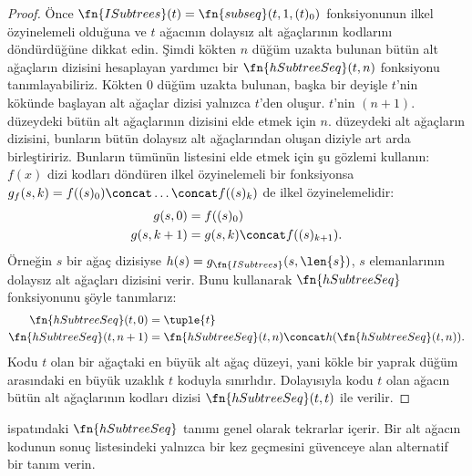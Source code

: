 \begin{proof}
  Önce $\fn{ISubtrees}(t)=\fn{subseq}(t,1,(t)_0)$ fonksiyonunun ilkel
  özyinelemeli olduğuna ve $t$ ağacının dolaysız alt ağaçlarının kodlarını
  döndürdüğüne dikkat edin. Şimdi kökten $n$ düğüm uzakta bulunan bütün alt
  ağaçların dizisini hesaplayan yardımcı bir $\fn{hSubtreeSeq}(t,n)$
  fonksiyonu tanımlayabiliriz. Kökten $0$ düğüm uzakta bulunan, başka bir
  deyişle $t$'nin kökünde başlayan alt ağaçlar dizisi yalnızca $t$'den
  oluşur. $t$'nin $(n+1)$. düzeydeki bütün alt ağaçlarının dizisini elde
  etmek için $n$. düzeydeki alt ağaçların dizisini, bunların bütün dolaysız
  alt ağaçlarından oluşan diziyle art arda birleştiririz. Bunların tümünün
  listesini elde etmek için şu gözlemi kullanın: $f(x)$ dizi kodları döndüren
  ilkel özyinelemeli bir fonksiyonsa
  $g_f(s,k)=f((s)_0)\concat\dots\concat f((s)_k)$ de ilkel
  özyinelemelidir:
  \begin{align*}
    g(s,0) & = f((s)_0)\\
    g(s,k+1) & = g(s,k)\concat f((s)_{k+1}).
  \end{align*}
  Örneğin $s$ bir ağaç dizisiyse
  $h(s)=g_{\fn{ISubtrees}}(s,\len{s})$, $s$ elemanlarının dolaysız alt
  ağaçları dizisini verir. Bunu kullanarak $\fn{hSubtreeSeq}$ fonksiyonunu
  şöyle tanımlarız:
  \begin{align*}
    \fn{hSubtreeSeq}(t,0) & = \tuple{t}\\
    \fn{hSubtreeSeq}(t,n+1) & =
      \fn{hSubtreeSeq}(t,n)\concat h(\fn{hSubtreeSeq}(t,n)).
  \end{align*}
  Kodu $t$ olan bir ağaçtaki en büyük alt ağaç düzeyi, yani kökle bir yaprak
  düğüm arasındaki en büyük uzaklık $t$ koduyla sınırlıdır. Dolayısıyla kodu
  $t$ olan ağacın bütün alt ağaçlarının kodları dizisi
  $\fn{hSubtreeSeq}(t,t)$ ile verilir.
\end{proof}

\begin{prob}
   ispatındaki
  $\fn{hSubtreeSeq}$ tanımı genel olarak tekrarlar içerir. Bir alt ağacın
  kodunun sonuç listesindeki yalnızca bir kez geçmesini güvenceye alan
  alternatif bir tanım verin.
\end{prob}

